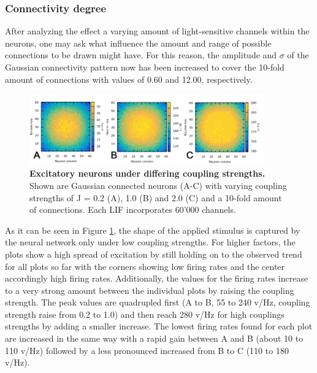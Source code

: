 \documentclass[14pt]{SelfArx} %
\numberwithin{equation}{section}
\begin{document}
\subsubsection{Connectivity degree}
After analyzing the effect a varying amount of light-sensitive channels within the neurons, one may ask what influence the amount and range of possible connections to be drawn might have. For this reason, the amplitude and $\sigma$ of the Gaussian connectivity pattern now has been increased to cover the 10-fold amount of connections with values of 0.60 and 12.00, respectively. \newline
\begin{figure} [htb]
\centering
\includegraphics[width = 0.9\textwidth]{ex60_10fold.png}
\caption{\textbf{Excitatory neurons under differing coupling strengths.} Shown are Gaussian connected neurons (A-C) with varying coupling strengths of J = 0.2 (A), 1.0 (B) and 2.0 (C) and a 10-fold amount of connections. Each LIF incorporates 60'000 channels.}
\label{fig:ex6010f}
\end{figure}
\newline
As it can be seen in Figure \ref{fig:ex6010f}, the shape of the applied stimulus is captured by the neural network only under low coupling strengths. For higher factors, the plots show a high spread of excitation by still holding on to the observed trend for all plots so far with the corners showing low firing rates and the center accordingly high firing rates. \newline
\newline
Additionally, the values for the firing rates increase to a very strong amount between the individual plots by raising the coupling strength. The peak values are quadrupled first (A to B, 55 to 240 v/Hz, coupling strength raise from 0.2 to 1.0) and then reach 280 v/Hz for high couplings strengths by adding a smaller increase. The lowest firing rates found for each plot are increased in the same way with a rapid gain between A and B (about 10 to 110 v/Hz) followed by a less pronounced increased from B to C (110 to 180 v/Hz). 
\end{document}
